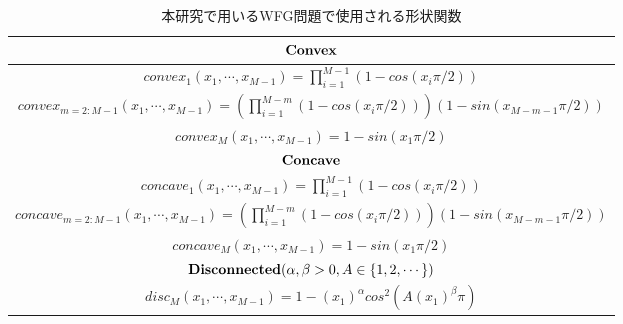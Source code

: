 \documentclass[../main/main]{subfiles}
\begin{document}
\begin{table}[htbp]
\fontsize{9.5pt}{9.5pt} \selectfont
\centering
\caption{本研究で用いるWFG問題で使用される形状関数}
\vspace{0.1cm}
\label{wfg_shape}
\begin{tabular}{|c|}
\hline 
$\bf{Convex}$\\
\hline
$convex_1(x_1, \cdots, x_{M-1}) = \prod^{M-1}_{i=1} (1 - cos(x_i \pi / 2 )) $\\
$convex_{m=2:M-1}(x_1, \cdots, x_{M-1}) =\left( \prod^{M-m}_{i=1} (1 - cos(x_i \pi / 2 )) \right) ( 1 - sin(x_{M-m-1} \pi / 2 ) )$\\
$convex_M(x_1, \cdots, x_{M-1}) = 1 - sin( x_1 \pi / 2 )$\\
\hline
\hline
$\bf{Concave}$\\
\hline
$concave_1(x_1, \cdots, x_{M-1}) = \prod^{M-1}_{i=1} (1 - cos(x_i \pi / 2 )) $\\
$concave_{m=2:M-1}(x_1, \cdots, x_{M-1}) =\left( \prod^{M-m}_{i=1} (1 - cos(x_i \pi / 2 )) \right) ( 1 - sin(x_{M-m-1} \pi / 2 ) )$\\
$concave_M(x_1, \cdots, x_{M-1}) = 1 - sin( x_1 \pi / 2 )$\\
\hline
\hline
${\bf Disconnected} (\alpha, \beta > 0, A \in \{1, 2, \cdots \}) $\\
\hline
$disc_M (x_1, \cdots, x_{M-1}) = 1 - (x_1)^\alpha cos^2 (A(x_1)^\beta \pi)$\\
\hline
\end{tabular}
\end{table}
\end{document}
